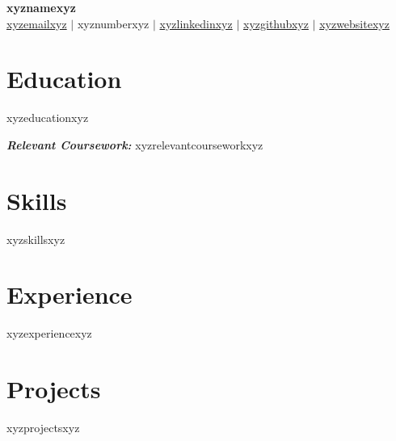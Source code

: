 \documentclass[a4paper,10pt]{article}
\begin{document}
\pagestyle{empty}

\begin{center}
    \textbf{\LARGE xyznamexyz} \\
    \vspace{7pt} 
    \href{mailto:xyzemailxyz}{xyzemailxyz} $\vert$ xyznumberxyz $\vert$ \href{https://linkedin.com/in/xyzlinkedinxyz}{\faLinkedin  { } xyzlinkedinxyz} $\vert$ \href{https://github.com/xyzgithubxyz}{\faGithub { } xyzgithubxyz} $\vert$ \href{https://xyzwebsitexyz}{xyzwebsitexyz}

\end{center}

\vspace{-20pt}
\section*{Education}
\vspace{-5pt}

\begin{itemize}
    xyzeducationxyz \\
\end{itemize}
\vspace{-5pt}
    \textit{\textbf{Relevant Coursework:}} xyzrelevantcourseworkxyz

\vspace{-10pt}
\section*{Skills}
\vspace{-5pt}
\begin{itemize}
   xyzskillsxyz
\end{itemize}

\vspace{-10pt}
\section*{Experience}
\vspace{-3pt}
xyzexperiencexyz
\vspace{-10pt}
\section*{Projects}
\vspace{-3pt}
xyzprojectsxyz
\end{document}
